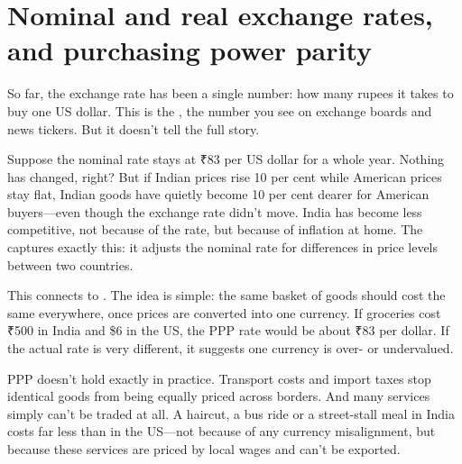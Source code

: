 \section{Nominal and real exchange rates, and purchasing power parity}\label{sec:real}

So far, the exchange rate has been a single number: how many rupees it takes to buy one US dollar. This is the , the number you see on exchange boards and news tickers. But it doesn't tell the full story.

Suppose the nominal rate stays at ₹83 per US dollar for a whole year. Nothing has changed, right? But if Indian prices rise 10 per cent while American prices stay flat, Indian goods have quietly become 10 per cent dearer for American buyers---even though the exchange rate didn't move. India has become less competitive, not because of the rate, but because of inflation at home. The  captures exactly this: it adjusts the nominal rate for differences in price levels between two countries.

This connects to . The idea is simple: the same basket of goods should cost the same everywhere, once prices are converted into one currency. If groceries cost ₹500 in India and \$6 in the US, the PPP rate would be about ₹83 per dollar. If the actual rate is very different, it suggests one currency is over- or undervalued.

PPP doesn't hold exactly in practice. Transport costs and import taxes stop identical goods from being equally priced across borders. And many services simply can't be traded at all. A haircut, a bus ride or a street-stall meal in India costs far less than in the US---not because of any currency misalignment, but because these services are priced by local wages and can't be exported.

